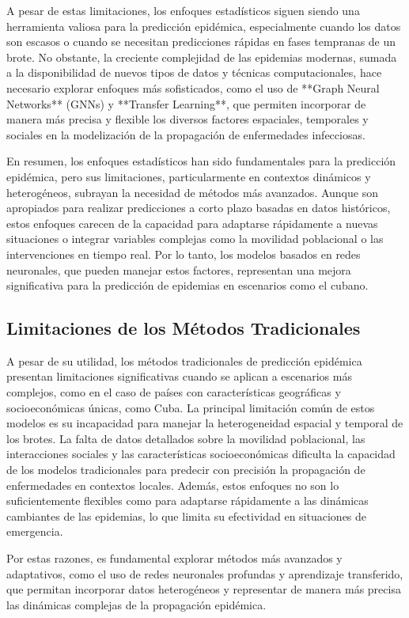 A pesar de estas limitaciones, los enfoques estadísticos siguen siendo una herramienta valiosa para la predicción epidémica, especialmente cuando los datos son escasos o cuando se necesitan predicciones rápidas en fases tempranas de un brote. No obstante, la creciente complejidad de las epidemias modernas, sumada a la disponibilidad de nuevos tipos de datos y técnicas computacionales, hace necesario explorar enfoques más sofisticados, como el uso de **Graph Neural Networks** (GNNs) y **Transfer Learning**, que permiten incorporar de manera más precisa y flexible los diversos factores espaciales, temporales y sociales en la modelización de la propagación de enfermedades infecciosas.

En resumen, los enfoques estadísticos han sido fundamentales para la predicción epidémica, pero sus limitaciones, particularmente en contextos dinámicos y heterogéneos, subrayan la necesidad de métodos más avanzados. Aunque son apropiados para realizar predicciones a corto plazo basadas en datos históricos, estos enfoques carecen de la capacidad para adaptarse rápidamente a nuevas situaciones o integrar variables complejas como la movilidad poblacional o las intervenciones en tiempo real. Por lo tanto, los modelos basados en redes neuronales, que pueden manejar estos factores, representan una mejora significativa para la predicción de epidemias en escenarios como el cubano.

\subsection{Limitaciones de los Métodos Tradicionales}

A pesar de su utilidad, los métodos tradicionales de predicción epidémica presentan limitaciones significativas cuando se aplican a escenarios más complejos, como en el caso de países con características geográficas y socioeconómicas únicas, como Cuba. La principal limitación común de estos modelos es su incapacidad para manejar la heterogeneidad espacial y temporal de los brotes. La falta de datos detallados sobre la movilidad poblacional, las interacciones sociales y las características socioeconómicas dificulta la capacidad de los modelos tradicionales para predecir con precisión la propagación de enfermedades en contextos locales. Además, estos enfoques no son lo suficientemente flexibles como para adaptarse rápidamente a las dinámicas cambiantes de las epidemias, lo que limita su efectividad en situaciones de emergencia.

Por estas razones, es fundamental explorar métodos más avanzados y adaptativos, como el uso de redes neuronales profundas y aprendizaje transferido, que permitan incorporar datos heterogéneos y representar de manera más precisa las dinámicas complejas de la propagación epidémica.

